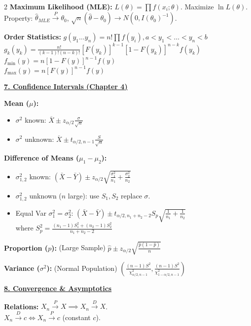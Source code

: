\documentclass{article}
\newcommand{\sectiontitle}[1]{\vspace{0.1cm}\textbf{\underline{#1}}\vspace{0.1cm}}
\newcommand{\distname}[1]{\textbf{#1}}
\begin{document}
\begin{multicols*}{2}
\distname{Maximum Likelihood (MLE):}
$L(\theta) = \prod f(x_i; \theta)$. Maximize $\ln L(\theta)$.
\\ Property: $\hat{\theta}_{MLE} \xrightarrow{P} \theta_0$, $\sqrt{n}(\hat{\theta}-\theta_0) \to N(0, I(\theta_0)^{-1})$.

\distname{Order Statistics:}
$g(y_1 \dots y_n) = n! \prod f(y_i), a < y_1 < \dots < y_n < b$
\\ $g_k(y_k) = \frac{n!}{(k-1)!(n-k)!} [F(y_k)]^{k-1} [1-F(y_k)]^{n-k} f(y_k)$
\\ $f_{\min}(y) = n[1-F(y)]^{n-1}f(y)$
\\ $f_{\max}(y) = n[F(y)]^{n-1}f(y)$

\sectiontitle{7. Confidence Intervals (Chapter 4)}

\distname{Mean ($\mu$):}
\begin{itemize}
    \item $\sigma^2$ known: $\overline{X} \pm z_{\alpha/2} \frac{\sigma}{\sqrt{n}}$
    \item $\sigma^2$ unknown: $\overline{X} \pm t_{\alpha/2, n-1} \frac{S}{\sqrt{n}}$
\end{itemize}

\distname{Difference of Means ($\mu_1 - \mu_2$):}
\begin{itemize}
    \item $\sigma_{1,2}^2$ known: $(\bar{X}-\bar{Y}) \pm z_{\alpha/2} \sqrt{\frac{\sigma_1^2}{n_1} + \frac{\sigma_2^2}{n_2}}$
    \item $\sigma_{1,2}^2$ unknown ($n$ large): use $S_1, S_2$ replace $\sigma$.
    \item Equal Var $\sigma_1^2=\sigma_2^2$: $(\bar{X}-\bar{Y}) \pm t_{\alpha/2, n_1+n_2-2} S_p \sqrt{\frac{1}{n_1}+\frac{1}{n_2}}$
    \\ where $S_p^2 = \frac{(n_1-1)S_1^2 + (n_2-1)S_2^2}{n_1+n_2-2}$
\end{itemize}

\distname{Proportion ($p$):} (Large Sample)
$\hat{p} \pm z_{\alpha/2} \sqrt{\frac{\hat{p}(1-\hat{p})}{n}}$

\distname{Variance ($\sigma^2$):} (Normal Population)
$\left( \frac{(n-1)S^2}{\chi^2_{\alpha/2, n-1}}, \frac{(n-1)S^2}{\chi^2_{1-\alpha/2, n-1}} \right)$

\sectiontitle{8. Convergence \& Asymptotics}

\distname{Relations:}
$X_n \xrightarrow{P} X \implies X_n \xrightarrow{D} X$.
\\ $X_n \xrightarrow{D} c \iff X_n \xrightarrow{P} c$ (constant $c$).


\end{multicols*}
\end{document}
